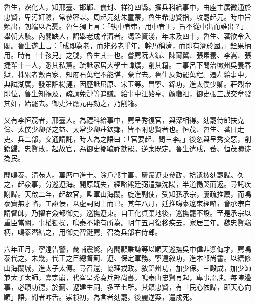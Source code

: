 \begin{pinyinscope}
魯生，霑化人，知邢臺、邯鄲、儀封、祥符四縣。擢兵科給事中，由座主廣微通於忠賢，卑污奸險，常參密謀。周起元劾朱童蒙，魯生希忠賢指，攻罷起元。時中旨頻出，朝端以為憂。魯生獨上言：「執中者帝，用中者王，旨不從中出而誰出？」舉朝大駭。內閣缺人，詔舉老成幹濟者。馮銓資淺，年未及四十，魯生、蕃欲令入閣。魯生遂上言：「成即為老，而非必老乎年。幹乃稱濟，而即有濟於國。」銓果柄用。時有「十孩兒」之號，魯生其一也。嘗薦阮大鋮、陳爾翼、張素養、李嵩、張捷輩十一人，悉其私黨。疏詆家居大學士韓爌，削其籍。主事呂下問治徽州吳養春獄，株累者數百家，知府石萬程不能堪，棄官去。魯生反劾罷萬程。遷左給事中，典試湖廣，發策詬楊漣，因歷詆屈原、宋玉等。冒寧、錦功，進太僕少卿。莊烈帝即位，魯生知禍及，疏請免漣等追贓。給事中汪始亨、顏繼祖，御史張三謨交章發其奸，始罷去。御史汪應元再劾之，乃削籍。

又有李恒茂者，邢臺人。為禮科給事中，薦呈秀復官，與深相得。劾罷侍郎扶克儉、太僕少卿孫之益、太常少卿莊欽鄰，皆不附忠賢者也。恒茂、魯生、蕃日走吏、兵二部，交通請託，時人為之語曰：「官要起，問三李。」後忽與呈秀交惡，削籍歸。忠賢敗，起故官，為御史鄒毓祚劾罷。逆案既定。魯生遣戍，蕃、恒茂贖徒為民。

閻鳴泰，清苑人。萬曆中進士。除戶部主事，屢遷遼東參政，拾遺被劾罷歸。久之，起僉事，分巡遼海。開原既失，經略熊廷弼遣撫沈陽，半道慟哭而返。尋託疾謝歸。天啟二年，起故官，監軍山海關。旋進副使，受知孫承宗，屢疏推薦，而鳴泰實無才略，工諂佞，以虛詞罔上而已。其年八月，廷推鳴泰遼東經略，會承宗自請督師，乃擢右僉都御史，巡撫遼東。自王化貞棄地後，巡撫罷不設。至是承宗以重臣當關，事權獨操，鳴泰不能有所為。明年五月復移疾去，家居三年。魏忠賢竊柄，鳴泰潛結之，用御史智鋌薦，召為兵部右侍郎。

六年正月，寧遠告警，畿輔震驚。內閣顧秉謙等以順天巡撫吳中偉非禦侮才，薦鳴泰代之。未幾，代王之臣總督薊、遼、保定軍務。寧遠敘功，進本部尚書。以繕修山海關城，進太子太傅。尋召還，協理戎政。敘錦州功，加少保。三殿成，加少師兼太子太師。熹宗崩，代崔呈秀為兵部尚書。鳴泰由忠賢再起，專事諂諛。每陳邊事，必頌功德，於薊、遼建生祠，多至七所。其頌忠賢，有「民心依歸，即天心向順」語，聞者咋舌。崇禎初，為言者劾罷。後麗逆案，遣戍死。


\end{pinyinscope}
